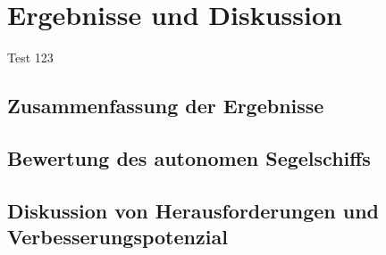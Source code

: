 

\chapter{Ergebnisse und Diskussion }
\label{chap:diskussion}
Test 123

\section{Zusammenfassung der Ergebnisse}
\section{Bewertung des autonomen Segelschiffs}
\section{Diskussion von Herausforderungen und Verbesserungspotenzial}